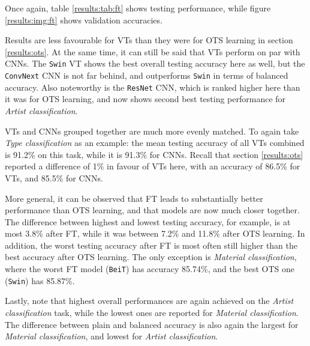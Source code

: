 Once again, table \ref{results:tab:ft} shows testing performance, while figure \ref{results:img:ft} shows validation accuracies.

Results are less favourable for VTs than they were for OTS learning in section \ref{results:ots}. At the same time, it can still be said that VTs perform on par with CNNs. The \texttt{Swin} VT shows the best overall testing accuracy here as well, but the \texttt{ConvNext} CNN is not far behind, and outperforms \texttt{Swin} in terms of balanced accuracy. Also noteworthy is the \texttt{ResNet} CNN, which is ranked higher here than it was for OTS learning, and now shows second best testing performance for \textit{Artist classification}.

VTs and CNNs grouped together are much more evenly matched. To again take \textit{Type classification} as an example: the mean testing accuracy of all VTs combined is 91.2\% on this task, while it is 91.3\% for CNNs. Recall that section \ref{results:ots} reported a difference of 1\% in favour of VTs here, with an accuracy of 86.5\% for VTs, and 85.5\% for CNNs.

More general, it can be observed that FT leads to substantially better performance than OTS learning, and that models are now much closer together. The difference between highest and lowest testing accuracy, for example, is at most 3.8\% after FT, while it was between 7.2\% and 11.8\% after OTS learning. In addition, the worst testing accuracy after FT is most often still higher than the best accuracy after OTS learning. The only exception is \textit{Material classification}, where the worst FT model (\texttt{BeiT}) has accuracy 85.74\%, and the best OTS one (\texttt{Swin}) has 85.87\%.

Lastly, note that highest overall performances are again achieved on the \textit{Artist classification} task, while the lowest ones are reported for \textit{Material classification}. The difference between plain and balanced accuracy is also again the largest for \textit{Material classification}, and lowest for \textit{Artist classification}.



